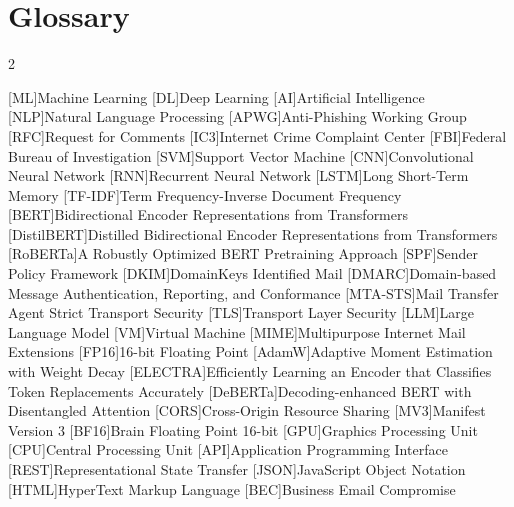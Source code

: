 \chapter{Glossary}

\footnotesize
\SingleSpacing

\begin{multicols}{2}
\begin{acronym}[AAAAAA]

	[ML]{Machine Learning}
	[DL]{Deep Learning}
	[AI]{Artificial Intelligence}
	[NLP]{Natural Language Processing}
	[APWG]{Anti-Phishing Working Group}
	[RFC]{Request for Comments}
	[IC3]{Internet Crime Complaint Center}
	[FBI]{Federal Bureau of Investigation}
	[SVM]{Support Vector Machine}
	[CNN]{Convolutional Neural Network}
	[RNN]{Recurrent Neural Network}
	[LSTM]{Long Short-Term Memory}
	[TF-IDF]{Term Frequency-Inverse Document Frequency}
	[BERT]{Bidirectional Encoder Representations from Transformers}
	[DistilBERT]{Distilled Bidirectional Encoder Representations from Transformers}
	[RoBERTa]{A Robustly Optimized BERT Pretraining Approach}
	[SPF]{Sender Policy Framework}
	[DKIM]{DomainKeys Identified Mail}
	[DMARC]{Domain-based Message Authentication, Reporting, and Conformance}
	[MTA-STS]{Mail Transfer Agent Strict Transport Security}
	[TLS]{Transport Layer Security}
	[LLM]{Large Language Model}
	[VM]{Virtual Machine}
	[MIME]{Multipurpose Internet Mail Extensions}
	[FP16]{16-bit Floating Point}
	[AdamW]{Adaptive Moment Estimation with Weight Decay}
	[ELECTRA]{Efficiently Learning an Encoder that Classifies Token Replacements Accurately}
	[DeBERTa]{Decoding-enhanced BERT with Disentangled Attention}
	[CORS]{Cross-Origin Resource Sharing}
	[MV3]{Manifest Version 3}
	[BF16]{Brain Floating Point 16-bit}
	[GPU]{Graphics Processing Unit}
	[CPU]{Central Processing Unit}
	[API]{Application Programming Interface}
	[REST]{Representational State Transfer}
	[JSON]{JavaScript Object Notation}
	[HTML]{HyperText Markup Language}
	[BEC]{Business Email Compromise}

\end{acronym}
\end{multicols}

